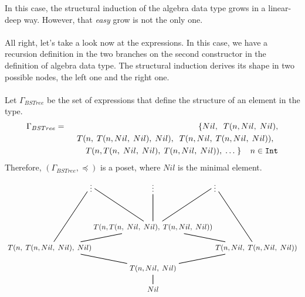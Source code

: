 In this case, the structural induction of the  algebra data type grows in a linear-deep way. However, that \textit{easy} grow is not the only one.\\\\
All right, let's take a look now at the  expressions. In this case, we have a recursion definition in the two branches on the second constructor in the definition of  algebra data type. The structural induction derives its shape in two possible nodes, the left one and the right one.\\\\
Let $\Gamma_{BSTree}$ be the set of expressions that define the structure of an element in the  type.
\begin{eqnarray*}
	\Gamma_{BSTree} & = & \{ Nil, \;\; T(n, Nil, \; Nil), \\
	&& \;\; T(n, \; T(n, Nil, \; Nil), \; Nil), \;\; T(n, Nil, \; T(n, Nil, \; Nil)), \;\;  \\
	&& \;\; T(n, T(n, \; Nil, \; Nil), \; T(n, Nil, \; Nil)), \; \ldots \; \} \;\; \;\; n \in \texttt{Int}
\end{eqnarray*}
Therefore, $(\Gamma_{BSTree}, \preceq)$ is a poset, where $Nil$ is the minimal element.
\begin{align*}
	\begin{tikzpicture}                                                       
	\node (a3) at (3,4) {$\vdots$};                                           
	\node (a2) at (0,4) {$\vdots$};                                           
	\node (a1) at (-3,4) {$\vdots$};                                          
	\node (c2) at (0,2) {$T(n, T(n, \; Nil, \; Nil), \; T(n, Nil, \; Nil))$}; 
	\node (c3) at (5,1) {$T(n, Nil, \; T(n, Nil, \; Nil))$};                  
	\node (c1) at (-5,1) {$T(n, \; T(n, Nil, \; Nil), \; Nil)$};              
	\node (d) at (0,0) {$T(n, Nil, \; Nil)$};                                 
	\node (min) at (0,-1) {$Nil$};                                            
	\draw [thick](min) -- (d) -- (c1) -- (c2) -- (a2);                        
	\draw [thick](c1) -- (a1);                                                
	\draw [thick](c3) -- (a3);                                                
	\draw [thick](c2) -- (a3);                                                
	\draw [thick](d) -- (c3) -- (c2) -- (a1);                                 
	\end{tikzpicture}                                                         
\end{align*}
